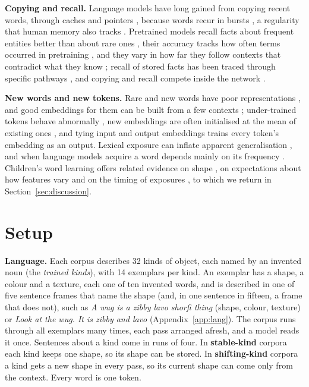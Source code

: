 \documentclass{article}
\begin{document}
\textbf{Copying and recall.} Language models have long gained from copying recent words, through caches and pointers \citep{kuhn1990,grave2017,merity2017}, because words recur in bursts \citep{church1995,church2000,madsen2005}, a regularity that human memory also tracks \citep{anderson1991}. Pretrained models recall facts about frequent entities better than about rare ones \citep{mallen2023,kandpal2023}, their accuracy tracks how often terms occurred in pretraining \citep{razeghi2022}, and they vary in how far they follow contexts that contradict what they know \citep{longpre2021,xie2024,du2024}; recall of stored facts has been traced through specific pathways \citep{geva2023}, and copying and recall compete inside the network \citep{yu2023,jin2024,ortu2024}.

\textbf{New words and new tokens.} Rare and new words have poor representations \citep{schick2020}, and good embeddings for them can be built from a few contexts \citep{herbelot2017,khodak2018}; under-trained tokens behave abnormally \citep{land2024}, new embeddings are often initialised at the mean of existing ones \citep{hewitt2021}, and tying input and output embeddings \citep{press2017,inan2017} trains every token's embedding as an output. Lexical exposure can inflate apparent generalisation \citep{kim2022lexical}, and when language models acquire a word depends mainly on its frequency \citep{chang2022}. Children's word learning offers related evidence on shape \citep{landau1988,smith2002}, on expectations about how features vary \citep{kemp2007,dewar2010} and on the timing of exposures \citep{childers2002,schwab2016}, to which we return in Section~\ref{sec:discussion}.

\section{Setup}\label{sec:setup}\label{sec:background}
\textbf{Language.} Each corpus describes 32 kinds of object, each named by an invented noun (the \emph{trained kinds}), with 14 exemplars per kind. An exemplar has a shape, a colour and a texture, each one of ten invented words, and is described in one of five sentence frames that name the shape (and, in one sentence in fifteen, a frame that does not), such as \emph{A wug is a zibby lavo shorfi thing} (shape, colour, texture) or \emph{Look at the wug. It is zibby and lavo} (Appendix~\ref{app:lang}). The corpus runs through all exemplars many times, each pass arranged afresh, and a model reads it once. Sentences about a kind come in runs of four. In \textbf{stable-kind} corpora each kind keeps one shape, so its shape can be stored. In \textbf{shifting-kind} corpora a kind gets a new shape in every pass, so its current shape can come only from the context. Every word is one token.
\end{document}
